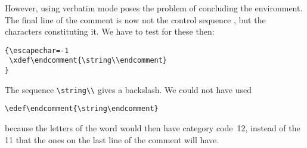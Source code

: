 \documentclass[letterpaper]{book}
\begin{document}
However, using verbatim mode poses the problem of concluding the 
environment.
\altt
The final line of the comment is now not the control sequence
, but the characters constituting it. We have
to test for these then:
\begin{verbatim}
{\escapechar=-1
 \xdef\endcomment{\string\\endcomment}
}
\end{verbatim}
The sequence \verb>\string\\> gives a backslash.
We could not have used
\begin{verbatim}
\edef\endcomment{\string\endcomment}
\end{verbatim}
because
the letters of the word  would then have
category code~12, instead of the 11 that the ones on the
last line of the comment will have.

\endofchapter
\end{document}
